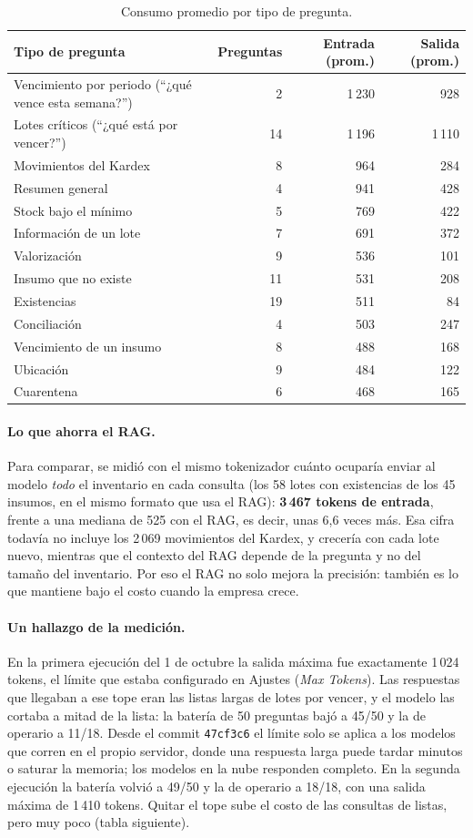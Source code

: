 \documentclass[letterpaper,11pt]{article}
\begin{document}
\begin{table}[H]
\centering
\small
\begin{tabular}{lrrr}
\toprule
Tipo de pregunta & Preguntas & Entrada (prom.) & Salida (prom.) \\
\midrule
Vencimiento por periodo (``¿qué vence esta semana?'') & 2 & 1\,230 & 928 \\
Lotes críticos (``¿qué está por vencer?'') & 14 & 1\,196 & 1\,110 \\
Movimientos del Kardex & 8 & 964 & 284 \\
Resumen general & 4 & 941 & 428 \\
Stock bajo el mínimo & 5 & 769 & 422 \\
Información de un lote & 7 & 691 & 372 \\
Valorización & 9 & 536 & 101 \\
Insumo que no existe & 11 & 531 & 208 \\
Existencias & 19 & 511 & 84 \\
Conciliación & 4 & 503 & 247 \\
Vencimiento de un insumo & 8 & 488 & 168 \\
Ubicación & 9 & 484 & 122 \\
Cuarentena & 6 & 468 & 165 \\
\bottomrule
\end{tabular}
\caption{Consumo promedio por tipo de pregunta.}
\end{table}

\paragraph{Lo que ahorra el RAG.} Para comparar, se midió con el mismo tokenizador cuánto ocuparía enviar al modelo \emph{todo} el inventario en cada consulta (los 58 lotes con existencias de los 45 insumos, en el mismo formato que usa el RAG): \textbf{3\,467 tokens de entrada}, frente a una mediana de 525 con el RAG, es decir, unas 6,6 veces más. Esa cifra todavía no incluye los 2\,069 movimientos del Kardex, y crecería con cada lote nuevo, mientras que el contexto del RAG depende de la pregunta y no del tamaño del inventario. Por eso el RAG no solo mejora la precisión: también es lo que mantiene bajo el costo cuando la empresa crece.

\paragraph{Un hallazgo de la medición.} En la primera ejecución del 1 de octubre la salida máxima fue exactamente 1\,024 tokens, el límite que estaba configurado en Ajustes (\emph{Max Tokens}). Las respuestas que llegaban a ese tope eran las listas largas de lotes por vencer, y el modelo las cortaba a mitad de la lista: la batería de 50 preguntas bajó a 45/50 y la de operario a 11/18. Desde el commit \texttt{47cf3c6} el límite solo se aplica a los modelos que corren en el propio servidor, donde una respuesta larga puede tardar minutos o saturar la memoria; los modelos en la nube responden completo. En la segunda ejecución la batería volvió a 49/50 y la de operario a 18/18, con una salida máxima de 1\,410 tokens. Quitar el tope sube el costo de las consultas de listas, pero muy poco (tabla siguiente).
\end{document}
